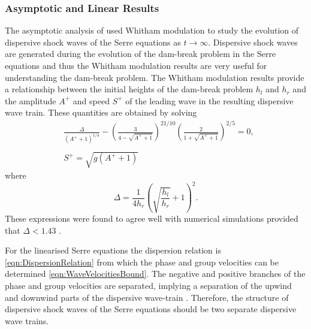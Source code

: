 \subsubsection{Asymptotic and Linear Results}
The asymptotic analysis of \citet{El-etal-2006} used Whitham modulation to study the evolution of dispersive shock waves of the Serre equations as $t\rightarrow \infty$. Dispersive shock waves are generated during the evolution of the dam-break problem in the Serre equations and thus the Whitham modulation results are very useful for understanding the dam-break problem. The Whitham modulation results provide a relationship between the initial heights of the dam-break problem $h_l$ and $h_r$ and the amplitude $A^+$ and speed $S^+$ of the leading wave in the resulting dispersive wave train. These quantities are obtained by solving
\begin{subequations}
	\begin{align}
	&\frac{\Delta}{\left(A^+ + 1\right)^{1/4}} - \left(\frac{3}{4 -  \sqrt{A^+ + 1}}\right)^{21/10} \left(\frac{2}{1 + \sqrt{A^+ + 1}}\right)^{2/5} = 0,	\label{eqn:Aplusdef} \\  \nonumber \\
	&S^+ = \sqrt{g \left(A^+ + 1\right)}	\label{eqn:Splusdef}
	\end{align}
	\label{eqn:ELWhitMod}	
\end{subequations}
where
\begin{equation*}
\Delta = \frac{1}{4 h_r}\left(\sqrt{\dfrac{h_l}{h_r}} + 1\right)^2.
\end{equation*}
These expressions were found to agree well with numerical simulations provided that $\Delta < 1.43$ \cite{El-etal-2006}.

For the linearised Serre equations the dispersion relation is \eqref{eqn:DispersionRelation} from which the phase and group velocities can be determined \eqref{eqn:WaveVelocitiesBound}. The negative and positive branches of the phase and group velocities are separated, implying a separation of the upwind and downwind parts of the dispersive wave-train \cite{Dougalis-etal-2007}. Therefore, the structure of dispersive shock waves of the Serre equations should be two separate dispersive wave trains.


